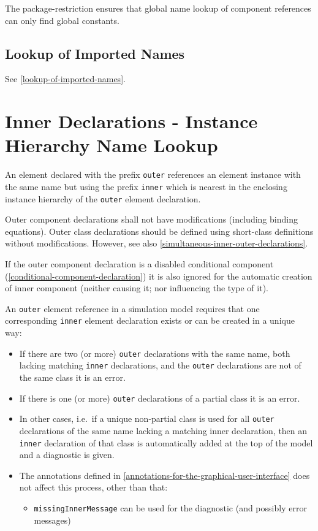 \begin{nonnormative}
The package-restriction ensures that global name lookup of component references can only find global constants.
\end{nonnormative}


\subsection{Lookup of Imported Names}\label{lookup-of-imported-names1}

See \cref{lookup-of-imported-names}.


\section{Inner Declarations - Instance Hierarchy Name Lookup}\label{instance-hierarchy-name-lookup-of-inner-declarations}\label{inner-declarations-instance-hierarchy-name-lookup}

An element declared with the prefix \lstinline!outer! references an element instance with the same name but using the prefix \lstinline!inner! which is nearest in the enclosing instance hierarchy of the \lstinline!outer! element declaration.

Outer component declarations shall not have modifications (including binding equations).
Outer class declarations should be defined using short-class definitions without modifications.
However, see also \cref{simultaneous-inner-outer-declarations}.

If the outer component declaration is a disabled conditional component (\cref{conditional-component-declaration}) it is also ignored for the automatic creation of inner component (neither causing it; nor influencing the type of it).

An \lstinline!outer! element reference in a simulation model requires that one corresponding \lstinline!inner! element declaration exists or can be created in a unique way:
\begin{itemize}
\item
  If there are two (or more) \lstinline!outer! declarations with the same name, both lacking matching \lstinline!inner! declarations, and the \lstinline!outer! declarations are not of the same class it is an error.
\item
  If there is one (or more) \lstinline!outer! declarations of a partial class it is an error.
\item
  In other cases, i.e.\ if a unique non-partial class is used for all \lstinline!outer! declarations of the same name lacking a matching inner declaration, then an \lstinline!inner! declaration of that class is automatically added at the top of the model and a diagnostic is given.
\item
  The annotations defined in \cref{annotations-for-the-graphical-user-interface} does not affect this process, other than that:
  \begin{itemize}
  \item
    \lstinline!missingInnerMessage! can be used for the diagnostic (and possibly error messages)
  \end{itemize}
\end{itemize}

